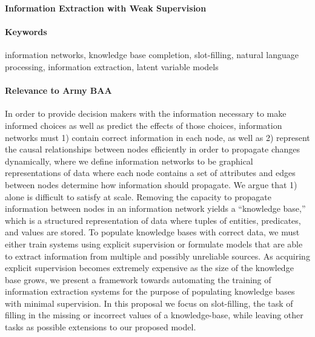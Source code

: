 \documentclass[11pt]{article}
\begin{document}

\begin{center}
\textbf{Information Extraction with Weak Supervision}
\end{center}

\begin{comment}
Spectrum from hard attention => hard segmental => HSMM for generative model, coverage / recall
Should we go into HSMM??? or is hard segmental attention enough

composition function = categorical over two entries of x

structured attention for IE posterior?
\end{comment}

\paragraph{Keywords}
information networks, knowledge base completion, slot-filling, natural language processing, information extraction,
latent variable models

\paragraph{Relevance to Army BAA}
In order to provide decision makers with the information
necessary to make informed choices as well as predict the effects of those choices,
information networks must
1) contain correct information in each node, as well as 
2) represent the causal relationships between nodes efficiently in order to propagate changes dynamically,
where we define information networks to be graphical representations of data where each node contains
a set of attributes and edges between nodes determine how information should propagate.
We argue that 1) alone is difficult to satisfy at scale.
Removing the capacity to propagate information between nodes in an 
information network yields a ``knowledge base,'' which is a structured representation of data
where tuples of entities, predicates, and values are stored.
To populate knowledge bases with correct data,
we must either train systems using explicit supervision or
formulate models that are able to extract information from multiple and
possibly unreliable sources.
As acquiring explicit supervision becomes extremely expensive as the size
of the knowledge base grows,
we present a framework towards automating the
training of information extraction systems for the purpose of 
populating knowledge bases with minimal supervision.
In this proposal we focus on slot-filling, the task of filling in the missing or incorrect values of a knowledge-base,
while leaving other tasks as possible extensions to our proposed model.
\end{document}
